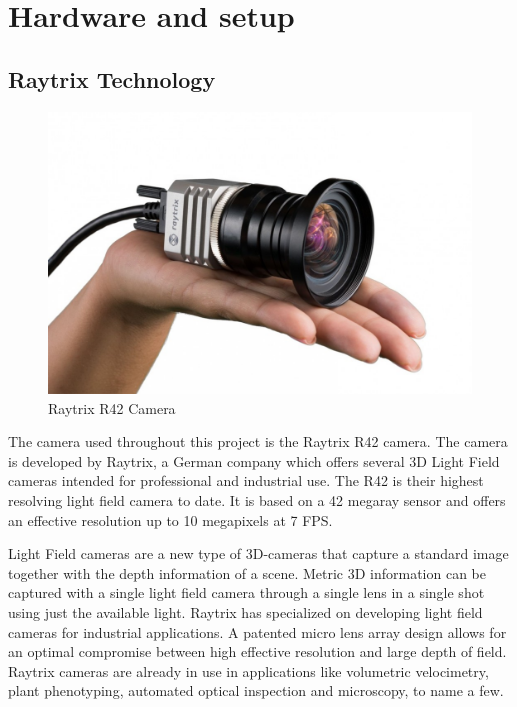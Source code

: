 \section{Hardware and setup}

\subsection{Raytrix Technology}\label{the_raytrix_camera}

\begin{figure}[ht]
    \centering
    \includegraphics[width=.9\linewidth]{images/hardware/raytrix_camera}
    \caption{Raytrix R42 Camera}
    \label{fig:raytrix_camera}
\end{figure}

The camera used throughout this project is the Raytrix R42 camera. The camera is developed by Raytrix, a German company which offers several 3D Light Field cameras intended for professional and industrial use. The R42 is their highest resolving light field camera to date. It is based on a 42 megaray sensor and offers an effective resolution up to 10 megapixels at 7 FPS. \cite{website:raytrix_r42}

Light Field cameras are a new type of 3D-cameras that capture a standard image together with the depth information of a scene. Metric 3D information can be captured with a single light field camera through a single lens in a single shot using just the available light. Raytrix has specialized on developing light field cameras for industrial applications. A patented micro lens array design allows for an optimal compromise between high effective resolution and large depth of field. Raytrix cameras are already in use in applications like volumetric velocimetry, plant phenotyping, automated optical inspection and microscopy, to name a few. \cite{website:raytrix_main}

